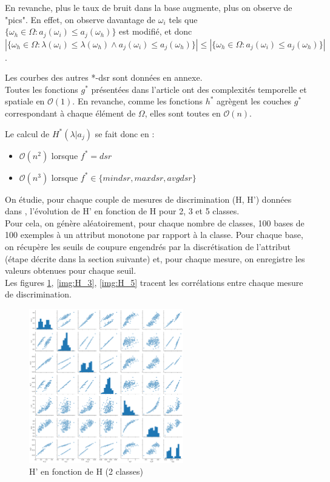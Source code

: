 \documentclass[a4paper]{article}
\begin{document}
\noindent En revanche, plus le taux de bruit dans la base augmente, plus on observe de
"pics". En effet, on observe davantage de $\omega_i$ tels que $ \{\omega_h \in
\Omega : a_j(\omega_i) \leq a_j(\omega_h)\} $ est modifié, et donc  $|
\{\omega_h \in \Omega : \lambda(\omega_i) \leq \lambda(\omega_h) \land
a_j(\omega_i) \leq a_j(\omega_h)\} | \leq | \{\omega_h \in \Omega :
a_j(\omega_i) \leq a_j(\omega_h)\} |$.

\noindent Les courbes des autres *-dsr sont données en annexe.\\

Toutes les fonctions $g^*$ présentées dans l'article ont des complexités
temporelle et spatiale en $\mathcal{O}(1)$. En revanche, comme les fonctions
$h^*$ agrègent les couches $g^*$ correspondant à chaque élément de $\Omega$,
elles sont toutes en $\mathcal{O}(n)$.   

Le calcul de $H^*(\lambda | a_j)$ se fait donc en :
\begin{itemize}
    \item $\mathcal{O}(n^2)$ lorsque $f^* = dsr$ 
    \item $\mathcal{O}(n^3)$ lorsque $f^* \in \{mindsr, maxdsr, avgdsr\}$  \\
\end{itemize} 

On étudie, pour chaque couple de mesures de discrimination (H, H') données dans
\cite{marsala-rank}, l'évolution de H' en fonction de H pour 2, 3 et 5 classes.
\\ Pour cela, on génère aléatoirement, pour chaque nombre de classes, 100 bases
de 100 exemples à un attribut monotone par rapport à la classe. Pour chaque
base, on récupère les seuils de coupure engendrés par la discrétisation de
l'attribut (étape décrite dans la section suivante) et, pour
chaque mesure, on enregistre les valeurs obtenues pour chaque seuil.\\ Les
figures \ref{img:H_2}, \ref{img:H_3}, \ref{img:H_5} tracent les corrélations
entre chaque mesure de discrimination. \\

\begin{figure}[H]
	\center 
	\includegraphics[width=0.6\textwidth]{images/H_2.png}
    \caption{H' en fonction de H (2 classes)}
    \label{img:H_2}
\end{figure}
\end{document}
